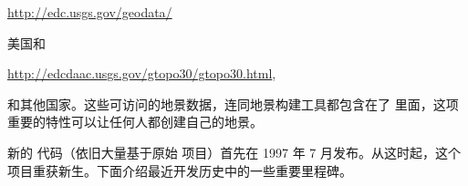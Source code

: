  \medskip

 \href{http://edc.usgs.gov/geodata/}{http://edc.usgs.gov/geodata/}
 \medskip

\noindent
\ifchinese
美国和
\fi
\iffalse
 \IfLanguageName{english}{
 for the U.S., and
 }{}
 \IfLanguageName{french}{
 pour les Etats-Unis et
 }{}
\fi
  \medskip

 \href{http://edcdaac.usgs.gov/gtopo30/gtopo30.html}{http://edcdaac.usgs.gov/gtopo30/gtopo30.html},
  \medskip

\noindent
\ifchinese
和其他国家。这些可访问的地景数据，连同地景构建工具都包含在了 \FlightGear{} 里面，这项重要的特性可以让任何人都创建自己的地景。

新的 \FlightGear{} 代码（依旧大量基于原始  项目）首先在 1997 年 7 月发布。从这时起，这个项目重获新生。下面介绍最近开发历史中的一些重要里程碑。
\fi
\iffalse
\IfLanguageName{english}{
 resp., for other countries. Those freely accessible scenery data, in
 conjunction with scenery building tools included with
 \FlightGear{}, are an important feature enabling anyone to
  create his or her own scenery.

This new \FlightGear{} code - still largely being based on the original \Index{LaRCsim}
code - was released in July 1997. From that moment the project gained momentum again.
Here are some milestones in the more recent development history.
}{}
\IfLanguageName{french}{
 pour les autres pays. Ces donn\'{e}es de sc\`{e}nes accessibles librement, en conjonction
 avec les outils de construction des sc\`{e}nes inclus dans \FlightGear{}, sont des
 fonctionnalit\'{e}s importantes permettant \`{a} chacun(e) de cr\'{e}er ses propres sc\`{e}nes.

Ce nouveau code de \FlightGear{} - toujours largement bas\'{e} sur le code original de \Index{LaRCsim}
- a \'{e}t\'{e} mis \`{a} disposition en juillet 1997. A partir de cet instant, le projet reprit de
l'inertie. Voi\c{c}i les principales \'{e}tapes dans l'histoire r\'{e}cente du d\'{e}veloppement.
}{}
\fi

\ifchinese
